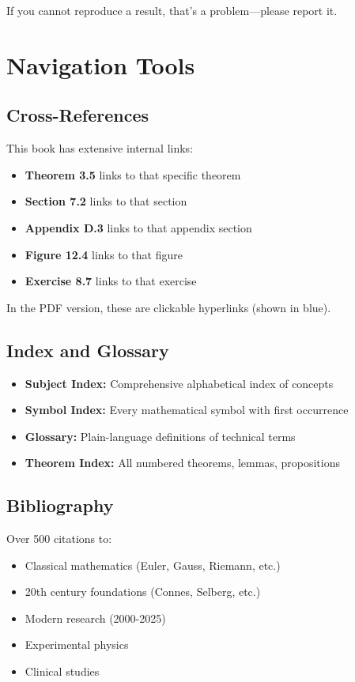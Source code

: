 If you cannot reproduce a result, that's a problem—please report it.

\section*{Navigation Tools}

\subsection*{Cross-References}

This book has extensive internal links:
\begin{itemize}
\item \textbf{Theorem 3.5} links to that specific theorem
\item \textbf{Section 7.2} links to that section
\item \textbf{Appendix D.3} links to that appendix section
\item \textbf{Figure 12.4} links to that figure
\item \textbf{Exercise 8.7} links to that exercise
\end{itemize}

In the PDF version, these are clickable hyperlinks (shown in blue).

\subsection*{Index and Glossary}

\begin{itemize}
\item \textbf{Subject Index:} Comprehensive alphabetical index of concepts
\item \textbf{Symbol Index:} Every mathematical symbol with first occurrence
\item \textbf{Glossary:} Plain-language definitions of technical terms
\item \textbf{Theorem Index:} All numbered theorems, lemmas, propositions
\end{itemize}

\subsection*{Bibliography}

Over 500 citations to:
\begin{itemize}
\item Classical mathematics (Euler, Gauss, Riemann, etc.)
\item 20th century foundations (Connes, Selberg, etc.)
\item Modern research (2000-2025)
\item Experimental physics
\item Clinical studies
\end{itemize}

